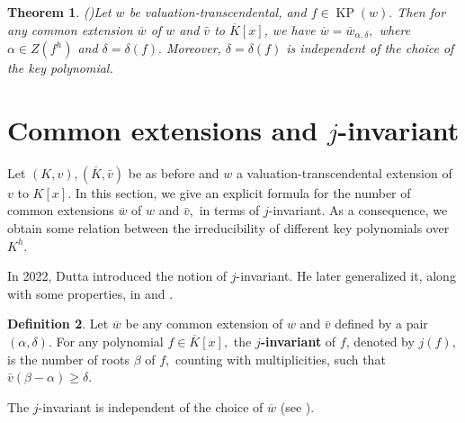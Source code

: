 \documentclass[11pt]{amsart}
\newtheorem{theorem}{Theorem}[section]
\theoremstyle{definition}
\newtheorem{definition}[theorem]{Definition}
\theoremstyle{remark}
\numberwithin{equation}{section}
\begin{document}
 \begin{theorem}(\cite[Remark 3.14]{EJP})\label{t2}
 	Let $w$ be valuation-transcendental, and $f\in\operatorname{KP}(w).$ Then for any common extension $\overline{w}$ of $w$ and $\bar{v}$ to $\overline{K}[x]$, we have $\overline{w}=\overline{w}_{\alpha,\delta},$ where $\alpha\in Z(f^h)$ and $\delta=\delta(f).$ Moreover, $\delta=\delta(f)$ is independent of the choice of the key polynomial.
 \end{theorem}
 
 \section{Common extensions and $j$-invariant}
 Let $(K,v), (\overline{K},\bar{v})$ be as before and $w$ a valuation-transcendental extension of $v$ to $K[x].$ In this section, we give an explicit formula for the number of common extensions $\overline{w}$ of $w$ and $\bar{v},$ in terms of $j$-invariant. As a consequence, we obtain some relation between the irreducibility of different key polynomials over $K^h.$
 
 In 2022, Dutta \cite{AD1}  introduced the notion of $j$-invariant. He later generalized it, along with some properties, in \cite{AD2} and \cite{AR}.
 \begin{definition}
  Let $\overline{w}$ be any common extension of $w$ and $\bar{v}$ defined by a pair $(\alpha,\delta)$. For any polynomial $f\in\overline{K}[x],$ the {\bf$j$-invariant} of $f$, denoted by $j(f),$ is the number of roots $\beta$ of $f,$ counting with multiplicities, such that $\bar{v}(\beta-\alpha)\geq \delta.$	
 \end{definition}
    The $j$-invariant is independent of the choice of $\overline{w}$ (see \cite[Theorem 3.1]{AD2}). 
 
\end{document}

